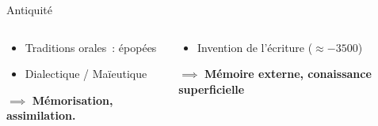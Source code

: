 \begin{frame}{Antiquité}
\begin{columns}
\end{columns}
\begin{columns}
	\begin{column}{0.49\linewidth}
		\begin{itemize}
			\item Traditions orales~: épopées
			\item Dialectique / Maïeutique
		\end{itemize}
		$\implies$ \textbf{Mémorisation, assimilation.}
	\end{column}
	\begin{column}{0.49\linewidth}
		\begin{itemize}
			\item Invention de l'écriture ($\approx -3500$)
		\end{itemize}
		$\implies$ \textbf{Mémoire externe, conaissance superficielle}
	\end{column}
\end{columns}
\end{frame}

